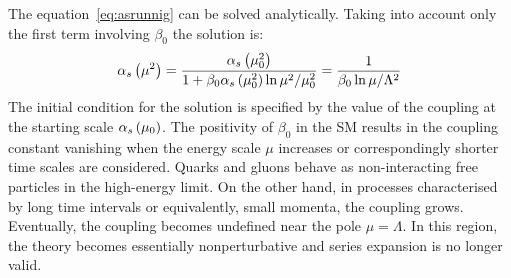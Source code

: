 The equation~\ref{eq:asrunnig} can be solved analytically. Taking into account only the first term involving $\beta_0$ the solution is:
\begin{equation}
 \mbox{$\alpha_{s}$}\left(\mu^2\right) = \dfrac{ \mbox{$\alpha_{s}$}\left(\mu_0^2\right) }{1+\beta_0\mbox{$\alpha_{s}$}\left(\mu_0^2\right)\ln{\mu^2/\mu_0^2}} = \dfrac{1}{\beta_0\ln{\mu/\Lambda^2}}
\label{eq:asrunnigsolution}
\end{equation}
The initial condition for the solution is specified by the value of the coupling at the starting scale $\mbox{$\alpha_{s}$}\left(\mu_0\right)$. The positivity of $\beta_0$ in the SM results in the coupling constant vanishing when the energy scale $\mu$ increases or correspondingly shorter time scales are considered. Quarks and gluons behave as non-interacting free particles in the high-energy limit. On the other hand, in processes characterised by long time intervals or equivalently, small momenta, the coupling grows. Eventually, the coupling becomes undefined near the pole $\mu = \Lambda$. In this region, the theory becomes essentially nonperturbative and series expansion is no longer valid. 

